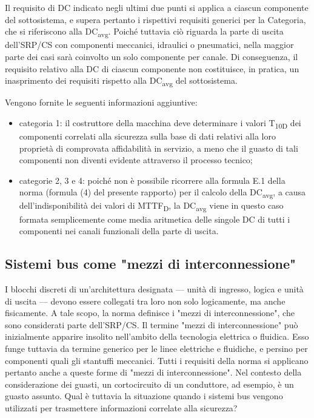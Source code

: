 Il requisito di DC indicato negli ultimi due punti si applica a ciascun componente del sottosistema, e supera pertanto i rispettivi requisiti generici per la Categoria, che si riferiscono alla DC\textsubscript{avg}. Poiché tuttavia ciò riguarda la parte di uscita dell'SRP/CS con componenti meccanici, idraulici o pneumatici, nella maggior parte dei casi sarà coinvolto un solo componente per canale. Di conseguenza, il requisito relativo alla DC di ciascun componente non costituisce, in pratica, un inasprimento dei requisiti rispetto alla DC\textsubscript{avg} del sottosistema.

Vengono fornite le seguenti informazioni aggiuntive:
\begin{itemize}
    \item categoria 1: il costruttore della macchina deve determinare i valori T\textsubscript{10D} dei componenti correlati alla sicurezza sulla base di dati relativi alla loro proprietà di comprovata affidabilità in servizio, a meno che il guasto di tali componenti non diventi evidente attraverso il processo tecnico;
    \item categorie 2, 3 e 4: poiché non è possibile ricorrere alla formula E.1 della norma (formula (4) del presente rapporto) per il calcolo della DC\textsubscript{avg}, a causa dell'indisponibilità dei valori di MTTF\textsubscript{D}, la DC\textsubscript{avg} viene in questo caso formata semplicemente come media aritmetica delle singole DC di tutti i componenti nei canali funzionali della parte di uscita.
\end{itemize}

\subsection{Sistemi bus come "mezzi di interconnessione"}
\label{subsec:06-2-18}
I blocchi discreti di un'architettura designata — unità di ingresso, logica e unità di uscita — devono essere collegati tra loro non solo logicamente, ma anche fisicamente. A tale scopo, la norma definisce i "mezzi di interconnessione", che sono considerati parte dell'SRP/CS. Il termine "mezzi di interconnessione" può inizialmente apparire insolito nell'ambito della tecnologia elettrica o fluidica. Esso funge tuttavia da termine generico per le linee elettriche e fluidiche, e persino per componenti quali gli stantuffi meccanici. Tutti i requisiti della norma si applicano pertanto anche a queste forme di "mezzi di interconnessione". Nel contesto della considerazione dei guasti, un cortocircuito di un conduttore, ad esempio, è un guasto assunto. Qual è tuttavia la situazione quando i sistemi bus vengono utilizzati per trasmettere informazioni correlate alla sicurezza?

